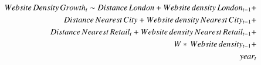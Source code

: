 \documentclass[
  authoryear,
  preprint,
  3p]{elsarticle}
\begin{document}
\begin{align} \label{model.growth}
Website\,Density\,Growth_{t} \sim Distance\,London +
Website\,density\,London_{t-1} +\notag\\
Distance\,Nearest\,City +
Website\,density\,Nearest\,City_{t-1} +\notag\\
Distance\,Nearest\,Retail_{i} +
Website\,density\,Nearest\,Retail_{t-1} +\notag\\
W*\, Website\,density_{t-1} +\notag\\ 
year_{t}
\end{align}


\renewcommand\refname{References}
  
\end{document}

